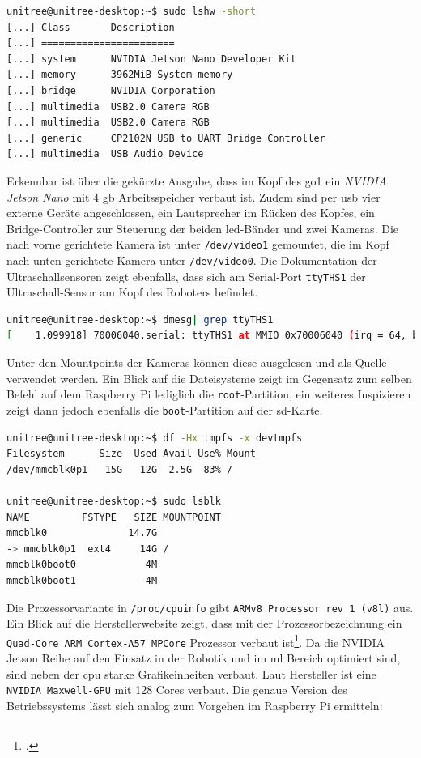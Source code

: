 \begin{lstlisting}[language=sh, label=lst:nanos-hardware-kopf, columns=fixed]
unitree@unitree-desktop:~$ sudo lshw -short
[...] Class       Description
[...] =======================
[...] system      NVIDIA Jetson Nano Developer Kit
[...] memory      3962MiB System memory
[...] bridge      NVIDIA Corporation
[...] multimedia  USB2.0 Camera RGB
[...] multimedia  USB2.0 Camera RGB
[...] generic     CP2102N USB to UART Bridge Controller
[...] multimedia  USB Audio Device
\end{lstlisting}

Erkennbar ist über die gekürzte Ausgabe, dass im Kopf des \gls{go1} ein \emph{NVIDIA Jetson Nano} mit \num{4} \gls{gb}
Arbeitsspeicher verbaut ist.
Zudem sind per \gls{usb} vier externe Geräte angeschlossen, ein Lautsprecher im Rücken des Kopfes, ein Bridge-Controller
zur Steuerung der beiden \gls{led}-Bänder und zwei Kameras.
Die nach vorne gerichtete Kamera ist unter \texttt{/dev/video1} gemountet, die im Kopf nach unten gerichtete Kamera unter
\texttt{/dev/video0}.
Die Dokumentation der Ultraschallsensoren zeigt ebenfalls, dass sich am Serial-Port \texttt{ttyTHS1} der Ultraschall-Sensor
am Kopf des Roboters befindet.

\begin{lstlisting}[language=sh, label=lst:nano-head-ulrtassonic]
unitree@unitree-desktop:~$ dmesg| grep ttyTHS1
[    1.099918] 70006040.serial: ttyTHS1 at MMIO 0x70006040 (irq = 64, base_baud = 0) is a TEGRA_UART
\end{lstlisting}

Unter den Mountpoints der Kameras können diese ausgelesen und als Quelle verwendet werden.
Ein Blick auf die Dateisysteme zeigt im Gegensatz zum selben Befehl auf dem Raspberry Pi lediglich die \texttt{root}-Partition,
ein weiteres Inspizieren zeigt dann jedoch ebenfalls die \texttt{boot}-Partition auf der \gls{sd}-Karte.

\begin{lstlisting}[language=sh, label=lst:nanos-kopf-fs, columns=fixed]
unitree@unitree-desktop:~$ df -Hx tmpfs -x devtmpfs
Filesystem      Size  Used Avail Use% Mount
/dev/mmcblk0p1   15G   12G  2.5G  83% /

unitree@unitree-desktop:~$ sudo lsblk
NAME         FSTYPE   SIZE MOUNTPOINT
mmcblk0              14.7G
-> mmcblk0p1  ext4     14G /
mmcblk0boot0            4M
mmcblk0boot1            4M
\end{lstlisting}

Die Prozessorvariante in \texttt{/proc/cpuinfo} gibt \texttt{ARMv8 Processor rev 1 (v8l)} aus.
Ein Blick auf die Herstellerwebsite zeigt, dass mit der Prozessorbezeichnung ein \texttt{Quad-Core ARM Cortex-A57 MPCore} Prozessor verbaut ist\footcite{nvidia_website_vergleich}.
Da die NVIDIA Jetson Reihe auf den Einsatz in der Robotik und im \gls{ml} Bereich optimiert sind, sind neben der \gls{cpu}
starke Grafikeinheiten verbaut.
Laut Hersteller ist eine \texttt{NVIDIA Maxwell-GPU} mit 128 Cores verbaut.
Die genaue Version des Betriebssystems lässt sich analog zum Vorgehen im Raspberry Pi ermitteln:

